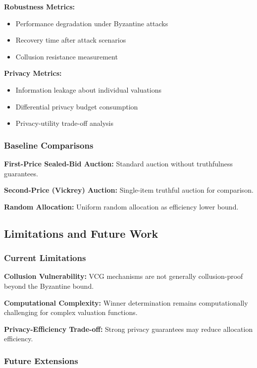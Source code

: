 \documentclass[conference]{IEEEtran}
\begin{document}
\textbf{Robustness Metrics:}
\begin{itemize}
    \item Performance degradation under Byzantine attacks
    \item Recovery time after attack scenarios
    \item Collusion resistance measurement
\end{itemize}

\textbf{Privacy Metrics:}
\begin{itemize}
    \item Information leakage about individual valuations
    \item Differential privacy budget consumption
    \item Privacy-utility trade-off analysis
\end{itemize}

\subsubsection{Baseline Comparisons}

\textbf{First-Price Sealed-Bid Auction:} Standard auction without truthfulness guarantees.

\textbf{Second-Price (Vickrey) Auction:} Single-item truthful auction for comparison.

\textbf{Random Allocation:} Uniform random allocation as efficiency lower bound.

\subsection{Limitations and Future Work}

\subsubsection{Current Limitations}

\textbf{Collusion Vulnerability:} VCG mechanisms are not generally collusion-proof beyond the Byzantine bound.

\textbf{Computational Complexity:} Winner determination remains computationally challenging for complex valuation functions.

\textbf{Privacy-Efficiency Trade-off:} Strong privacy guarantees may reduce allocation efficiency.

\subsubsection{Future Extensions}
\end{document}
